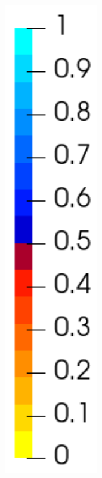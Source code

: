 \begin{figure}[!htb]
\begin{subfigure}[b]{0.1\textwidth}
    \includegraphics[width=0.45\textwidth]{Chapter5/figures/spallation/colorbar_c}
    \vspace{3em}
  \end{subfigure}
  

\end{figure}
